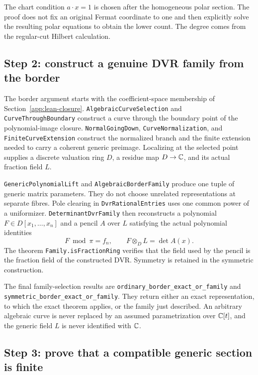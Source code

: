 The chart condition $a\cdot x=1$ is chosen after the homogeneous polar
section.  The proof does not fix an original Fermat coordinate to one and
then explicitly solve the resulting polar equations to obtain the lower
count.  The degree comes from the regular-cut Hilbert calculation.

\subsection{Step 2: construct a genuine DVR family from the border}
\label{app:lean-family}

The border argument starts with the coefficient-space membership of
Section~\ref{app:lean-closure}.  \nolinkurl{AlgebraicCurveSelection} and
\nolinkurl{CurveThroughBoundary} construct a curve through the boundary
point of the polynomial-image closure.  \nolinkurl{NormalGoingDown},
\nolinkurl{CurveNormalization}, and \nolinkurl{FiniteCurveExtension}
construct the normalized branch and the finite extension needed to carry
a coherent generic preimage.  Localizing at the selected point supplies
a discrete valuation ring $D$, a residue map $D\to\mathbb{C}$, and its actual
fraction field $L$.

\nolinkurl{GenericPolynomialLift} and \nolinkurl{AlgebraicBorderFamily}
produce one tuple of generic matrix parameters.  They do not choose
unrelated representations at separate fibres.  Pole clearing in
\nolinkurl{DvrRationalEntries} uses one common power of a uniformizer.
\nolinkurl{DeterminantDvrFamily} then reconstructs a polynomial
$F\in D[x_1,\ldots,x_n]$ and a pencil $A$ over $L$ satisfying the actual
polynomial identities
\[
 F\bmod\pi=f_n,\qquad F\otimes_D L=\det A(x).
\]
The theorem \nolinkurl{Family.isFractionRing} verifies that the field used
by the pencil is the fraction field of the constructed DVR.  Symmetry is
retained in the symmetric construction.

The final family-selection results are
\nolinkurl{ordinary_border_exact_or_family} and
\nolinkurl{symmetric_border_exact_or_family}.  They return either an exact
representation, to which the exact theorem applies, or the family just
described.  An arbitrary algebraic curve is never replaced by an assumed
parametrization over $\mathbb{C}[t]$, and the generic field $L$ is never identified
with $\mathbb{C}$.

\subsection{Step 3: prove that a compatible generic section is finite}
\label{app:lean-generic}

